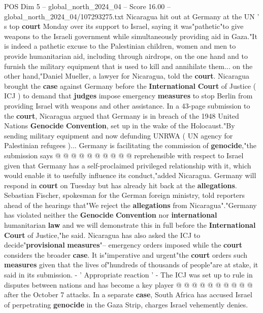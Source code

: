\begin{textsample}{POS Dim 5 – global\_north\_2024\_04 – Score 16.00 – global\_north\_2024\_04/107293275.txt}  \label{ex:f5_pos_268}
Nicaragua hit out at Germany at the UN ' s top \textbf{court} Monday over its support to Israel, saying it was"pathetic"to give weapons to the Israeli government while simultaneously providing aid in Gaza."It is indeed a pathetic excuse to the Palestinian children, women and men to provide humanitarian aid, including through airdrops, on the one hand and to furnish the military equipment that is used to kill and annihilate them... on the other hand,"Daniel Mueller, a lawyer for Nicaragua, told the \textbf{court}.
Nicaragua brought the \textbf{case} against Germany before the \textbf{International} \textbf{Court} of Justice ( ICJ ) to demand that \textbf{judges} impose emergency \textbf{measures} to stop Berlin from providing Israel with weapons and other assistance.
In a 43-page submission to the \textbf{court}, Nicaragua argued that Germany is in breach of the 1948 United Nations \textbf{Genocide} \textbf{Convention}, set up in the wake of the Holocaust."By sending military equipment and now defunding UNRWA ( UN agency for Palestinian refugees )...
Germany is facilitating the commission of \textbf{genocide},"the submission says @ @ @ @ @ @ @ @ @ @ reprehensible with respect to Israel given that Germany has a self-proclaimed privileged relationship with it, which would enable it to usefully influence its conduct,"added Nicaragua.
Germany will respond in \textbf{court} on Tuesday but has already hit back at the \textbf{allegations}.
Sebastian Fischer, spokesman for the German foreign ministry, told reporters ahead of the hearings that"We reject the \textbf{allegations} from Nicaragua"."Germany has violated neither the \textbf{Genocide} \textbf{Convention} nor \textbf{international} humanitarian \textbf{law} and we will demonstrate this in full before the \textbf{International} \textbf{Court} of Justice,"he said.
Nicaragua has also asked the ICJ to decide"\textbf{provisional} \textbf{measures}"-- emergency orders imposed while the \textbf{court} considers the broader \textbf{case}.
It is"imperative and urgent"the \textbf{court} orders such \textbf{measures} given that the lives of"hundreds of thousands of people"are at stake, it said in its submission. - ' Appropriate reaction ' - The ICJ was set up to rule in disputes between nations and has become a key player @ @ @ @ @ @ @ @ @ @ after the October 7 attacks.
In a separate \textbf{case}, South Africa has accused Israel of perpetrating \textbf{genocide} in the Gaza Strip, charges Israel vehemently denies.

\end{textsample}
